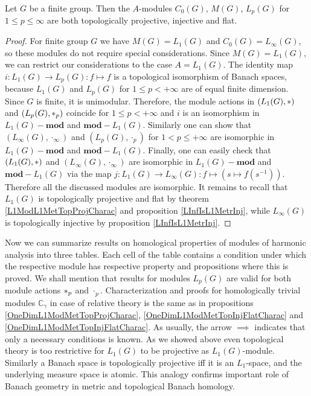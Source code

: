 \begin{proposition}\label{StdModFinGrL1MGTopInjProjFlatCharac} Let $G$ be a finite group. Then the $A$-modules $C_0(G)$, $M(G)$, $L_p(G)$ for $1\leq p\leq \infty$ are both topologically projective, injective and flat.
\end{proposition} 
\begin{proof}
For finite group $G$ we have $M(G)=L_1(G)$ and $C_0(G)=L_\infty(G)$, so these modules do not require special considerations. Since $M(G)=L_1(G)$, we can restrict our considerations to the case $A=L_1(G)$. The identity map $i:L_1(G)\to L_p(G):f\mapsto f$ is a topological isomorphism of Banach spaces, because $L_1(G)$ and $L_p(G)$ for $1\leq p<+\infty$ are of equal finite dimension. Since $G$ is finite, it is unimodular. Therefore, the module actions in $(L_1(G),\ast)$ and $(L_p(G),\ast_p)$ coincide for $1\leq p<+\infty$ and $i$ is an isomorphism in $L_1(G)-\mathbf{mod}$ and $\mathbf{mod}-L_1(G)$. Similarly one can show that $(L_\infty(G),\cdot_\infty)$ and $(L_p(G),\cdot_p)$ for $1<p\leq+\infty$ are isomorphic in $L_1(G)-\mathbf{mod}$ and $\mathbf{mod}-L_1(G)$. Finally, one can easily check that $(L_1(G),\ast)$ and $(L_\infty(G),\cdot_\infty)$ are isomorphic in $L_1(G)-\mathbf{mod}$ and $\mathbf{mod}-L_1(G)$ via the map $j:L_1(G)\to L_\infty(G):f\mapsto(s\mapsto f(s^{-1}))$. Therefore all the discussed modules are isomorphic. It remains to recall that $L_1(G)$ is topologically projective and flat by theorem \ref{L1ModL1MetTopProjCharac} and proposition \ref{LInfIsL1MetrInj}, while $L_\infty(G)$ is topologically injective by proposition \ref{LInfIsL1MetrInj}.
\end{proof}

Now we can summarize results on homological properties of modules of harmonic analysis into three tables. Each cell of the table contains a condition under which the respective module has respective property and propositions where this is proved. We shall mention that results for modules $L_p(G)$ are valid for both module actions $\ast_p$ and $\cdot_p$. Characterization and proofs for homologically trivial modules $\mathbb{C}_\gamma$ in case of relative theory is the same as in propositions \ref{OneDimL1ModMetTopProjCharac}, \ref{OneDimL1ModMetTopInjFlatCharac} and \ref{OneDimL1ModMetTopInjFlatCharac}. As usually, the arrow $\implies$ indicates that only a necessary conditions is known. As we showed above even topological theory is too restrictive for $L_1(G)$ to be projective as $L_1(G)$-module. Similarly a Banach space is topologically projective iff it is an $L_1$-space, and the underlying measure space is atomic. This analogy confirms important role of Banach geometry in metric and topological Banach homology.

